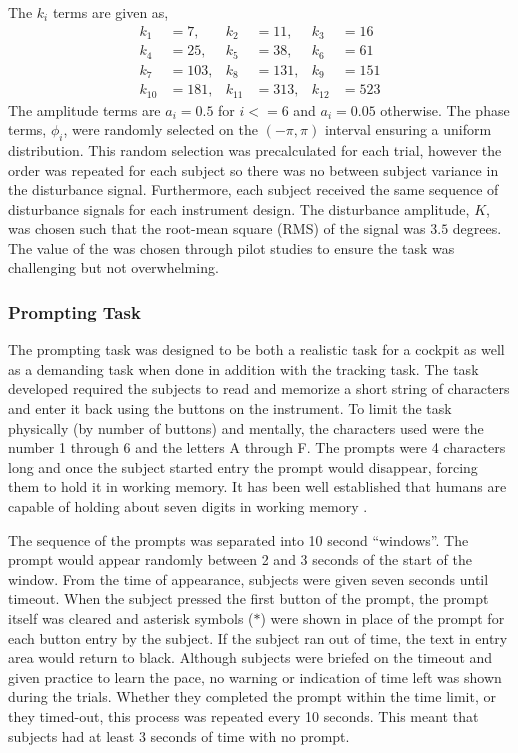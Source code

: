 The $k_i$ terms are given as,
\begin{align*}
    k_1 &= 7, & k_2 &= 11, & k_3 &= 16 \\
    k_4 &= 25, & k_5 &= 38, & k_6 &= 61 \\
    k_7 &= 103, & k_8 &= 131, & k_9 &= 151 \\
    k_{10} &= 181, & k_{11} &= 313, & k_{12} &= 523
\end{align*}
The amplitude terms are $a_i=0.5$ for $i <= 6$ and $a_i=0.05$ otherwise.
The phase terms, $\phi_i$, were randomly selected on the $(-\pi, \pi)$ interval ensuring a uniform distribution.
This random selection was precalculated for each trial, however the order was repeated for each subject so there was no between subject variance in the disturbance signal.
Furthermore, each subject received the same sequence of disturbance signals for each instrument design.
The disturbance amplitude, $K$, was chosen such that the root-mean square (RMS) of the signal was $3.5$ degrees.
The value of the was chosen through pilot studies to ensure the task was challenging but not overwhelming.

\subsubsection{Prompting Task}

The prompting task was designed to be both a realistic task for a cockpit as well as a demanding task when done in addition with the tracking task.
The task developed required the subjects to read and memorize a short string of characters and enter it back using the buttons on the instrument.
To limit the task physically (by number of buttons) and mentally, the characters used were the number 1 through 6 and the letters A through F.
The prompts were 4 characters long and once the subject started entry the prompt would disappear, forcing them to hold it in working memory.
It has been well established that humans are capable of holding about seven digits in working memory \citep{miller_magical_1956,baddeley_working_1992}.

The sequence of the prompts was separated into 10 second ``windows''.
The prompt would appear randomly between 2 and 3 seconds of the start of the window.
From the time of appearance, subjects were given seven seconds until timeout.
When the subject pressed the first button of the prompt, the prompt itself was cleared and asterisk symbols ($*$) were shown in place of the prompt for each button entry by the subject.
If the subject ran out of time, the text in entry area would return to black.
Although subjects were briefed on the timeout and given practice to learn the pace, no warning or indication of time left was shown during the trials.
Whether they completed the prompt within the time limit, or they timed-out, this process was repeated every 10 seconds.
This meant that subjects had at least 3 seconds of time with no prompt.

